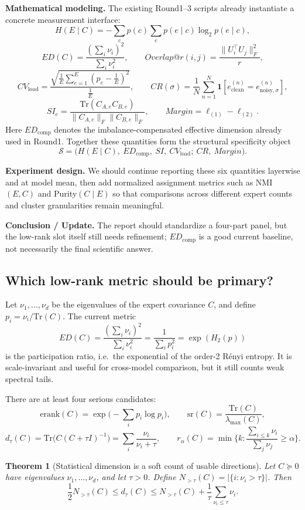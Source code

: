 \documentclass[11pt]{article}
\newtheorem{theorem}{Theorem}
\begin{document}
\textbf{Mathematical modeling.} The existing Round1--3 scripts already instantiate a concrete measurement interface:
\[
H(E\mid C)
=
-\sum_c p(c)\sum_e p(e\mid c)\log_2 p(e\mid c),
\]
\[
ED(C)=\frac{(\sum_i \nu_i)^2}{\sum_i \nu_i^2},
\qquad
Overlap@r(i,j)=\frac{\|U_i^\top U_j\|_F^2}{r},
\]
\[
CV_{\mathrm{load}}
=
\frac{\sqrt{\frac{1}{E}\sum_{e=1}^E (p_e-\frac{1}{E})^2}}{\frac{1}{E}},
\qquad
CR(\sigma)=\frac{1}{N}\sum_{n=1}^N \mathbf{1}[e_{\mathrm{clean}}^{(n)}=e_{\mathrm{noisy},\sigma}^{(n)}],
\]
\[
SI_e=\frac{\mathrm{Tr}(C_{A,e}C_{B,e})}{\|C_{A,e}\|_F\|C_{B,e}\|_F},
\qquad
Margin=\ell_{(1)}-\ell_{(2)}.
\]
Here $ED_{\mathrm{comp}}$ denotes the imbalance-compensated effective dimension already used in Round1. Together these quantities form the structural specificity object
\[
\mathcal{S}
=
\big(H(E\mid C),\ ED_{\mathrm{comp}},\ SI,\ CV_{\mathrm{load}};\ CR,\ Margin\big).
\]

\textbf{Experiment design.} We should continue reporting these six quantities layerwise and at model mean, then add normalized assignment metrics such as NMI$(E,C)$ and Purity$(C\mid E)$ so that comparisons across different expert counts and cluster granularities remain meaningful.

\textbf{Conclusion / Update.} The report should standardize a four-part panel, but the low-rank slot itself still needs refinement; $ED_{\mathrm{comp}}$ is a good current baseline, not necessarily the final scientific answer.

\subsection{Which low-rank metric should be primary?}
Let $\nu_1,\dots,\nu_d$ be the eigenvalues of the expert covariance $C$, and define $p_i=\nu_i/\mathrm{Tr}(C)$. The current metric
\[
ED(C)=\frac{(\sum_i \nu_i)^2}{\sum_i \nu_i^2}
=
\frac{1}{\sum_i p_i^2}
=
\exp(H_2(p))
\]
is the participation ratio, i.e.\ the exponential of the order-2 R\'enyi entropy. It is scale-invariant and useful for cross-model comparison, but it still counts weak spectral tails.

There are at least four serious candidates:
\[
\mathrm{erank}(C)=\exp\!\Big(-\sum_i p_i\log p_i\Big),
\qquad
\mathrm{sr}(C)=\frac{\mathrm{Tr}(C)}{\lambda_{\max}(C)},
\]
\[
d_\tau(C)=\mathrm{Tr}\!\big(C(C+\tau I)^{-1}\big)=\sum_i \frac{\nu_i}{\nu_i+\tau},
\qquad
r_\alpha(C)=\min\Big\{k:\frac{\sum_{i\le k}\nu_i}{\sum_j \nu_j}\ge \alpha\Big\}.
\]

\begin{theorem}[Statistical dimension is a soft count of usable directions]
Let $C\succeq 0$ have eigenvalues $\nu_1,\dots,\nu_d$, and let $\tau>0$. Define $N_{>\tau}(C)=|\{i:\nu_i>\tau\}|$. Then
\[
\frac{1}{2}N_{>\tau}(C)
\le
d_\tau(C)
\le
N_{>\tau}(C) + \frac{1}{\tau}\sum_{\nu_i\le \tau}\nu_i.
\]
\end{theorem}
\end{document}
